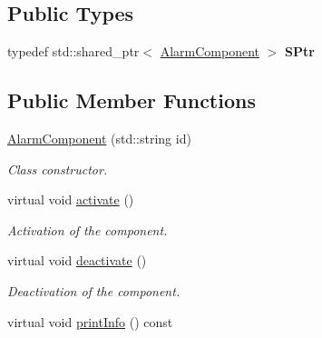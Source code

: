 \subsection*{Public Types}
\begin{DoxyCompactItemize}
\item 
typedef std\+::shared\+\_\+ptr$<$ \hyperlink{classAlarmComponent}{Alarm\+Component} $>$ {\bfseries S\+Ptr}\hypertarget{classAlarmComponent_a508e811a15269806af1a18aa4d387128}{}\label{classAlarmComponent_a508e811a15269806af1a18aa4d387128}

\end{DoxyCompactItemize}
\subsection*{Public Member Functions}
\begin{DoxyCompactItemize}
\item 
\hyperlink{classAlarmComponent_a4d10477bd20bbdb544e8a8ca8128add2}{Alarm\+Component} (std\+::string id)
\begin{DoxyCompactList}\small\item\em Class constructor. \end{DoxyCompactList}\item 
virtual void \hyperlink{classAlarmComponent_ab2acf6b580efe04bd617580ecb7323f1}{activate} ()\hypertarget{classAlarmComponent_ab2acf6b580efe04bd617580ecb7323f1}{}\label{classAlarmComponent_ab2acf6b580efe04bd617580ecb7323f1}

\begin{DoxyCompactList}\small\item\em Activation of the component. \end{DoxyCompactList}\item 
virtual void \hyperlink{classAlarmComponent_aef44069a068e92ccd15b3afcbd06dff6}{deactivate} ()\hypertarget{classAlarmComponent_aef44069a068e92ccd15b3afcbd06dff6}{}\label{classAlarmComponent_aef44069a068e92ccd15b3afcbd06dff6}

\begin{DoxyCompactList}\small\item\em Deactivation of the component. \end{DoxyCompactList}\item 
virtual void \hyperlink{classAlarmComponent_a012b3a3e0208a8dec3d6100c4789aeb7}{print\+Info} () const \hypertarget{classAlarmComponent_a012b3a3e0208a8dec3d6100c4789aeb7}{}\label{classAlarmComponent_a012b3a3e0208a8dec3d6100c4789aeb7}


\end{DoxyCompactItemize}
